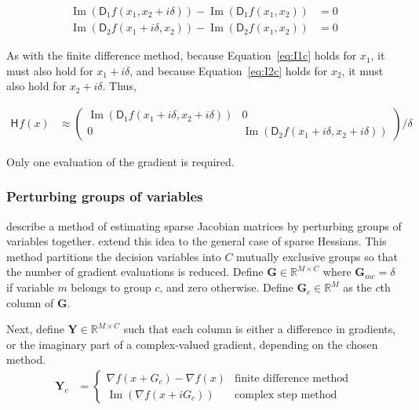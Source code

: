 \documentclass[jss]{jss}\usepackage[]{graphicx}\usepackage[]{color}
\newcommand{\parD}[3]{\mathsf{D}^{#1}_{#2}#3}
\newcommand{\hess}[2]{\mathsf{H}_{#1}#2}
\newcommand{\Mat}[1]{\mathbf{#1}}
\newcommand{\Real}[1]{\mathbb{R}^{#1}}
\DeclareMathOperator{\Imag}{Im}
\begin{document}
\begin{align}
  \Imag(\parD{}{1}{f(x_1,x_2+i\delta)}) -\Imag(\parD{}{1}{f(x_1,x_2)})&=0\label{eq:I1c}\\
    \Imag(\parD{}{2}{f(x_1+i\delta,x_2)})-\Imag(\parD{}{2}{f(x_1,x_2)})&=0\label{eq:I2c}
\end{align}

As with the finite difference method, because Equation~\ref{eq:I1c} holds
for $x_1$, it must also hold for $x_1+i\delta$, and because Equation~\ref{eq:I2c} holds
for $x_2$, it must also hold for $x_2+i\delta$. Thus,

\begin{align}
  \label{eq:CShess2sp}
  \hess{}{f(x)}&\approx
  \begin{pmatrix}
    \Imag(\parD{}{1}{f(x_1+i\delta, x_2+i\delta)})&0\\
        0&\Imag(\parD{}{2}{f(x_1+i\delta,x_2+i\delta)})
    \end{pmatrix}/\delta
\end{align}

Only one evaluation of the gradient is required.

\subsubsection[Perturbing groups of variables]{Perturbing groups of variables}

 describe a method of estimating sparse
Jacobian matrices by perturbing groups of variables together.
 extend this idea to the
general case of sparse Hessians.  This method partitions
the decision variables into $C$ mutually exclusive groups so that the number of gradient
evaluations is reduced.  Define $\Mat{G}\in\Real{M\times C}$ where $\Mat{G}_{mc}=\delta$ if variable $m$ belongs to group $c$, and zero
otherwise.  Define $\Mat{G}_c\in\Real{M}$ as the $c$th column of $\Mat{G}$.

Next, define $\Mat{Y}\in\Real{M\times C}$ such that each column is
either a difference in gradients, or the imaginary part of a
complex-valued gradient, depending on the chosen method.
\begin{align}
  \label{eq:Yg}
  \Mat{Y}_c&=
           \begin{cases}  
             \nabla f(x+G_c)-\nabla f(x)&\text{finite difference method}\\
             \Imag(\nabla f(x+iG_c))&\text{complex step method}
             \end{cases}
\end{align}
\end{document}
